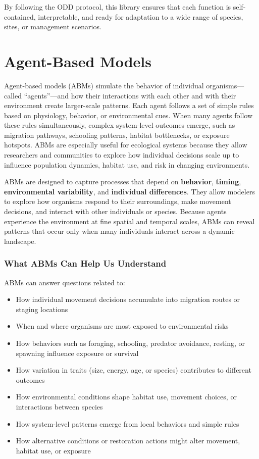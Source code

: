 \documentclass[
]{book}
\begin{document}
By following the ODD protocol, this library ensures that each function is self-contained, interpretable, and ready for adaptation to a wide range of species, sites, or management scenarios.

\chapter{Agent-Based Models}\label{agent-based-models}

Agent-based models (ABMs) simulate the behavior of individual organisms---called ``agents''---and how their interactions with each other and with their environment create larger-scale patterns. Each agent follows a set of simple rules based on physiology, behavior, or environmental cues. When many agents follow these rules simultaneously, complex system-level outcomes emerge, such as migration pathways, schooling patterns, habitat bottlenecks, or exposure hotspots. ABMs are especially useful for ecological systems because they allow researchers and communities to explore how individual decisions scale up to influence population dynamics, habitat use, and risk in changing environments.

ABMs are designed to capture processes that depend on \textbf{behavior}, \textbf{timing}, \textbf{environmental variability}, and \textbf{individual differences}. They allow modelers to explore how organisms respond to their surroundings, make movement decisions, and interact with other individuals or species. Because agents experience the environment at fine spatial and temporal scales, ABMs can reveal patterns that occur only when many individuals interact across a dynamic landscape.

\subsection{What ABMs Can Help Us Understand}\label{what-abms-can-help-us-understand}

ABMs can answer questions related to:

\begin{itemize}
\item
  How individual movement decisions accumulate into migration routes or staging locations
\item
  When and where organisms are most exposed to environmental risks
\item
  How behaviors such as foraging, schooling, predator avoidance, resting, or spawning influence exposure or survival
\item
  How variation in traits (size, energy, age, or species) contributes to different outcomes
\item
  How environmental conditions shape habitat use, movement choices, or interactions between species
\item
  How system-level patterns emerge from local behaviors and simple rules
\item
  How alternative conditions or restoration actions might alter movement, habitat use, or exposure
\end{itemize}
\end{document}
